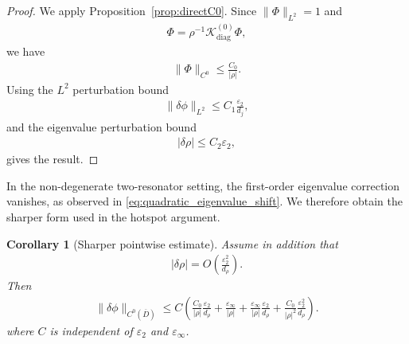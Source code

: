 \documentclass[10pt]{article}
\numberwithin{equation}{section}
\newtheorem{corollary}{Corollary}[theorem]
\begin{document}
\begin{proof}
We apply Proposition~\ref{prop:directC0}. Since $\|\Phi\|_{L^2}=1$ and
\begin{align*}
    \Phi=\rho^{-1}\mathcal{K}_{\mathrm{diag}}^{(0)}\Phi,
\end{align*}
we have
\begin{align*}
    \|\Phi\|_{C^0}
    \leq
    \frac{C_0}{|\rho|}.
\end{align*}
Using the $L^2$ perturbation bound
\begin{align*}
    \|\delta\phi\|_{L^2}
    \leq
    C_1\frac{\varepsilon_2}{d_j},
\end{align*}
and the eigenvalue perturbation bound
\begin{align*}
    |\delta\rho|\leq C_2\varepsilon_2,
\end{align*}
gives the result.
\end{proof}

In the non-degenerate two-resonator setting, the first-order eigenvalue correction vanishes, as observed in \eqref{eq:quadratic_eigenvalue_shift}. We therefore obtain the sharper form used in the hotspot argument.

\begin{corollary}[Sharper pointwise estimate]
\label{cor:C0_control_sharper}
Assume in addition that
\begin{align*}
    |\delta\rho|
    =
    O\left(
    \frac{\varepsilon_2^2}{d_\rho}
    \right).
\end{align*}
Then
\begin{align}
    \|\delta\phi\|_{C^0(\overline D)}
    \leq
    C\left(
    \frac{C_0}{|\rho|}\frac{\varepsilon_2}{d_\rho}
    +
    \frac{\varepsilon_\infty}{|\rho|}
    +
    \frac{\varepsilon_\infty}{|\rho|}\frac{\varepsilon_2}{d_\rho}
    +
    \frac{C_0}{|\rho|^2}\frac{\varepsilon_2^2}{d_\rho}
    \right).
    \label{eq:C0_control_sharper}
\end{align}
where $C$ is independent of $\varepsilon_2$ and $\varepsilon_\infty$.
\end{corollary}
\end{document}
